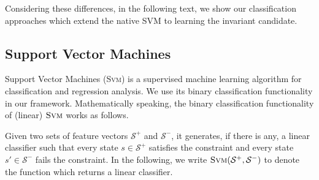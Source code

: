 Considering these differences,
in the following text, 
we show our classification approaches which extend the native SVM to learning the invariant candidate.  


\subsection{Support Vector Machines}
\label{subsec:svm}
Support Vector Machines (\textsc{Svm}) is a supervised machine learning algorithm for classification and regression analysis. 
We use its binary classification functionality in our framework. 
Mathematically speaking, the binary classification functionality of (linear) $\textsc{Svm}$ works as follows. 

Given two sets of feature vectors $\mathcal{S}^+$ and $\mathcal{S}^-$, it generates, 
if there is any, a linear classifier 
such that every state $s \in \mathcal{S}^+$ satisfies the constraint and every state $s' \in \mathcal{S}^-$ fails the constraint. 
In the following, we write $\textsc{Svm}(\mathcal{S}^+, \mathcal{S}^-)$ to denote the function which returns a linear classifier.

